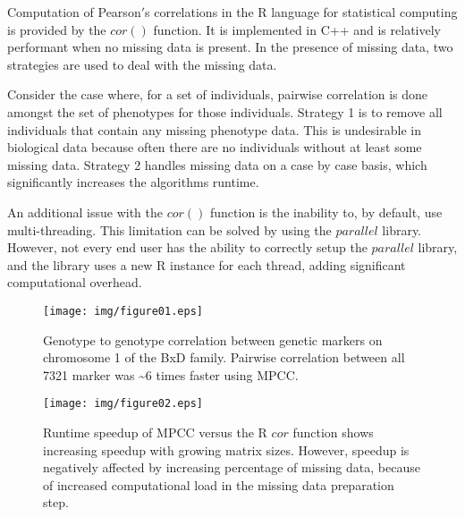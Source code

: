 \documentclass{bioinfo}
\begin{document}
Computation of Pearson$'$s correlations in the R language for statistical computing
\citep{R:2005} is provided by the $cor()$ function. It is implemented in C++ and is
relatively performant when no missing data is present. In the presence of missing
data, two strategies are used to deal with the missing data.

Consider the case where, for a set of individuals, pairwise correlation is done
amongst the set of phenotypes for those individuals. Strategy 1 is to remove
all individuals that contain any missing phenotype data. This is undesirable in
biological data because often there are no individuals without at least some
missing data. Strategy 2 handles missing data on a case by case basis,
which significantly increases the algorithms runtime.

An additional issue with the $cor()$ function is the inability to, by default, use
multi-threading. This limitation can be solved by using the $parallel$ library.
However, not every end user has the ability to correctly setup the $parallel$
library, and the library uses a new R instance for each thread, adding significant
computational overhead.
\vspace*{-5mm}
\begin{figure}[!t]
  \centerline{\texttt{[image: img/figure01.eps]}}
  \vspace*{-7mm}
  \caption{
    Genotype to genotype correlation between genetic markers on chromosome
    1 of the BxD family. Pairwise correlation between all 7321 marker was \textasciitilde{}6 times
    faster using MPCC.
  }
  \label{fig:fig1}
  \vspace*{-5mm}
\end{figure}
\begin{figure}[!t]
  \centerline{\texttt{[image: img/figure02.eps]}}
  \vspace*{-7mm}
  \caption{
    Runtime speedup of MPCC versus the R $cor$ function shows
    increasing speedup with growing matrix sizes. However,
    speedup is negatively affected by increasing percentage of
    missing data, because of increased computational load in the
    missing data preparation step.
  }
  \label{fig:fig2}
  \vspace*{-5mm}
\end{figure}
\end{document}
